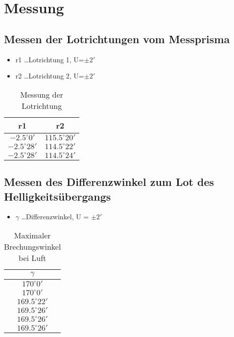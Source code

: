 \documentclass[a4paper]{article}
\begin{document}
\section{Messung}

\subsection{Messen der Lotrichtungen vom Messprisma}
\begin{table}[ht]
				\centering
				\caption{Messung der Lotrichtung}
				\begin{itemize}
								\item r1 \dots Lotrichtung 1, U=$\pm 2'$
								\item r2 \dots Lotrichtung 2, U=$\pm 2'$
				\end{itemize}
				\begin{tabular}{|c|c|}
								\hline
								r1&r2\\
								\hline
								$-2.5^\circ 0'$	& $115.5^\circ 20'$ \\
								\hline
								$-2.5^\circ 28'$	& $114.5^\circ 22'$ \\
								\hline
								$-2.5^\circ 28'$	& $114.5^\circ 24'$ \\
								\hline
				\end{tabular}
				\label{tab:lot}
\end{table}
\subsection{Messen des Differenzwinkel zum Lot des Helligkeitsübergangs}
\begin{table}[ht]
				\centering
				\caption{Maximaler Brechungswinkel bei Luft}
				\begin{itemize}
								\item $\gamma$ \dots Differenzwinkel, U = $\pm 2'$
				\end{itemize}
				\begin{tabular}{|c|}\hline
								$\gamma$\\ \hline
								$170^\circ 0'$\\\hline
								$170^\circ 0'$\\\hline
								$169.5^\circ 22'$\\\hline
								$169.5^\circ 26'$\\\hline
								$169.5^\circ 26'$\\\hline
								$169.5^\circ 26'$\\\hline
				\end{tabular}
				\label{tab:luft}
\end{table}
\end{document}
